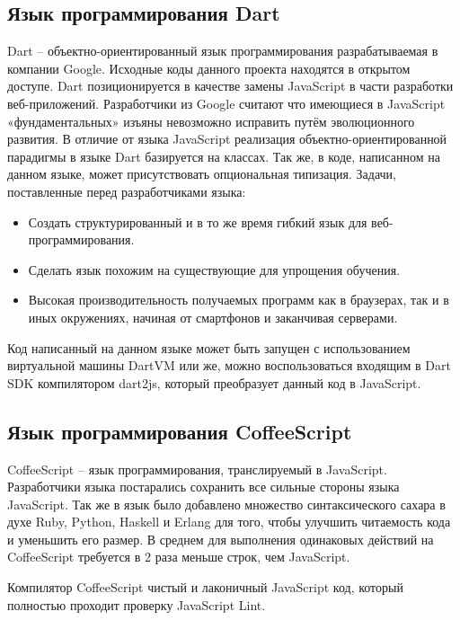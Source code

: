 \subsection{Язык программирования Dart}

Dart -- объектно-ориентированный язык программирования разрабатываемая в компании Google. Исходные коды данного проекта находятся в открытом доступе. Dart позиционируется в качестве замены JavaScript в части разработки веб-приложений. Разработчики из Google считают что имеющиеся в JavaScript «фундаментальных» изъяны невозможно исправить путём эволюционного развития. В отличие от языка JavaScript реализация объектно-ориентированной парадигмы в языке Dart базируется на классах. Так же, в коде, написанном на данном языке, может присутствовать опциональная типизация.
\cite{wiki:Dart:en}
Задачи, поставленные перед разработчиками языка:\cite{Dart}
\begin{itemize}
\item Создать структурированный и в то же время гибкий язык для веб-программирования.
\item Сделать язык похожим на существующие для упрощения обучения.
\item Высокая производительность получаемых программ как в браузерах, так и в иных окружениях, начиная от смартфонов и заканчивая серверами.
\end{itemize}

Код написанный на данном языке может быть запущен с использованием виртуальной машины DartVM или же, можно воспользоваться входящим в Dart SDK компилятором dart2js, который преобразует данный код в JavaScript.\cite{Dart}


\subsection{Язык программирования CoffeeScript}

CoffeeScript -- язык программирования, транслируемый в JavaScript. Разработчики языка постарались сохранить все сильные стороны языка JavaScript. Так же в язык было добавлено множество синтаксического сахара в духе Ruby, Python, Haskell и Erlang для того, чтобы улучшить читаемость кода и уменьшить его размер. В среднем для выполнения одинаковых действий на CoffeeScript требуется в 2 раза меньше строк, чем JavaScript.

Компилятор CoffeeScript чистый и лаконичный JavaScript код, который полностью проходит проверку JavaScript Lint.
\cite{CoffeeScript}

